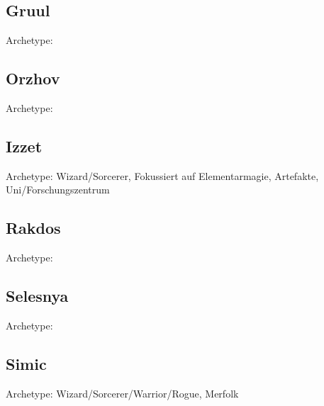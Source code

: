 \documentclass[12pt]{article}
\theoremstyle{plain}
\begin{document}
\subsection{Gruul}
Archetype:
\subsection{Orzhov}
Archetype:
\subsection{Izzet}
Archetype: Wizard/Sorcerer, Fokussiert auf Elementarmagie, Artefakte, Uni/Forschungszentrum
\subsection{Rakdos}
Archetype: 
\subsection{Selesnya}
Archetype:
\subsection{Simic}
Archetype: Wizard/Sorcerer/Warrior/Rogue, Merfolk
\end{document}
